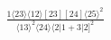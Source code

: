 \documentclass[varwidth, border=5pt]{standalone}
\begin{document}
\begin{my}
$\begin{gathered}
\scriptscriptstyle\frac{1⟨23⟩⟨12⟩[23][24]⟨25⟩^2}{⟨13⟩^2⟨24⟩⟨2|1+3|2]^2}
\end{gathered}$
\end{my}
\end{document}
